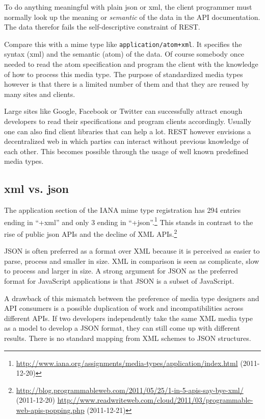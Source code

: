 \documentclass[12pt,a4paper]{scrartcl}		%
\newcommand{\citeurl}[2]{\url{#1} (#2)}
\begin{document}
To do anything meaningful with plain json or xml, the client programmer must
normally look up the meaning or \emph{semantic} of the data in the API
documentation. The data therefor fails the self-descriptive constraint of
REST.

Compare this with a mime type like \texttt{application/atom+xml}. It specifies
the syntax (xml) and the semantic (atom) of the data. Of course somebody once
needed to read the atom specification and program the client with the knowledge
of how to process this media type. The purpose of standardized media types
however is that there is a limited number of them and that they are reused by many
sites and clients.

Large sites like Google, Facebook or Twitter can successfully attract enough
developers to read their specifications and program clients accordingly. Usually
one can also find client libraries that can help a lot. REST however envisions a
decentralized web in which parties can interact without previous knowledge of
each other. This becomes possible through the usage of well known predefined
media types.

\subsection{xml vs. json}

The application section of the IANA mime type registration has 294 entries
ending in ``+xml'' and only 3 ending in
``+json''.\footnote{\citeurl{http://www.iana.org/assignments/media-types/application/index.html}{2011-12-20}}
This stands in contrast to the rise of public json APIs and the decline of XML
APIs.\footnote{\citeurl{http://blog.programmableweb.com/2011/05/25/1-in-5-apis-say-bye-xml/}{2011-12-20} \citeurl{http://www.readwriteweb.com/cloud/2011/03/programmable-web-apis-popping.php}{2011-12-21}}

JSON is often preferred as a format over XML because it is perceived as easier
to parse, process and smaller in size. XML in comparison is seen as complicate,
slow to process and larger in size. A strong argument for JSON as the preferred
format for JavaScript applications is that JSON is a subset of JavaScript.

A drawback of this mismatch between the preference of media type designers and
API consumers is a possible duplication of work and incompatibilities across
different APIs. If two developers independently take the same XML media type as
a model to develop a JSON format, they can still come up with different
results. There is no standard mapping from XML schemes to JSON structures.
\end{document}
